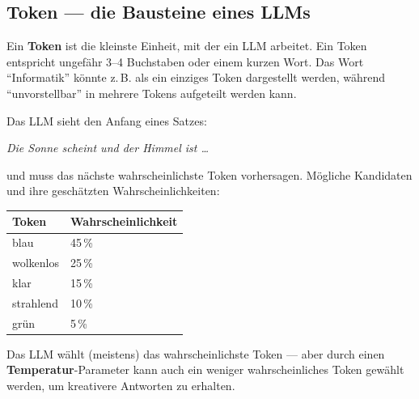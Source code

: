 \subsection{Token --- die Bausteine eines LLMs}

\begin{mydefinition}
Ein \textbf{Token} ist die kleinste Einheit, mit der ein LLM arbeitet. Ein Token
entspricht ungefähr 3--4 Buchstaben oder einem kurzen Wort. Das Wort
\enquote{Informatik} könnte z.\,B. als ein einziges Token dargestellt werden,
während \enquote{unvorstellbar} in mehrere Tokens aufgeteilt werden kann.
\end{mydefinition}

\begin{myexample}
Das LLM sieht den Anfang eines Satzes:
\begin{center}
    \textit{Die Sonne scheint und der Himmel ist \ldots}
\end{center}
und muss das nächste wahrscheinlichste Token vorhersagen.
Mögliche Kandidaten und ihre geschätzten Wahrscheinlichkeiten:

\begin{center}
\begin{tabular}{ll}
    \toprule
    \textbf{Token} & \textbf{Wahrscheinlichkeit} \\
    \midrule
    blau           & 45\,\%                       \\
    wolkenlos      & 25\,\%                       \\
    klar           & 15\,\%                       \\
    strahlend      & 10\,\%                       \\
    grün           & 5\,\%                        \\
    \bottomrule
\end{tabular}
\end{center}

Das LLM wählt (meistens) das wahrscheinlichste Token --- aber durch einen
\textbf{Temperatur}-Parameter kann auch ein weniger wahrscheinliches Token
gewählt werden, um kreativere Antworten zu erhalten.
\end{myexample}

